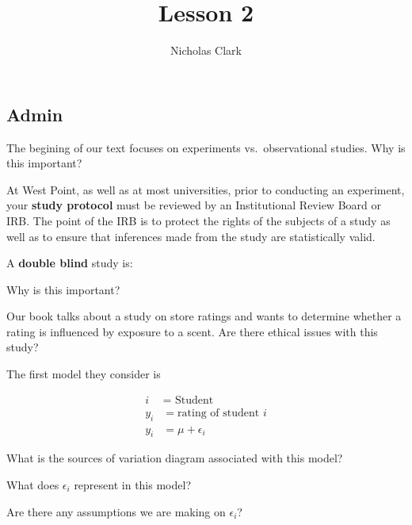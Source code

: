 \documentclass[
]{article}
\title{Lesson 2}
\author{Nicholas Clark}
\date{}
\begin{document}
\maketitle

\hypertarget{admin}{%
\subsection{Admin}\label{admin}}

\vspace{.3in}

The begining of our text focuses on experiments vs.~observational
studies. Why is this important?

\vspace{.3in}

At West Point, as well as at most universities, prior to conducting an
experiment, your \textbf{study protocol} must be reviewed by an
Institutional Review Board or IRB. The point of the IRB is to protect
the rights of the subjects of a study as well as to ensure that
inferences made from the study are statistically valid.

A \textbf{double blind} study is:

\vspace{.4in}

Why is this important?

\vspace{.5in}

Our book talks about a study on store ratings and wants to determine
whether a rating is influenced by exposure to a scent. Are there ethical
issues with this study?

\vspace{.3in}

The first model they consider is

\begin{align*}
i &= \mbox{ Student}\\
y_i & = \mbox{rating of student }i\\
y_i & = \mu + \epsilon_i
\end{align*}

What is the sources of variation diagram associated with this model?

\vspace{2.in}

What does \(\epsilon_i\) represent in this model?

\vspace{1.3in}

Are there any assumptions we are making on \(\epsilon_i\)?
\end{document}
